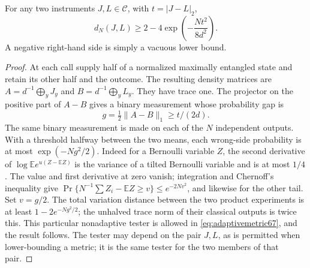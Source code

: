 \begin{lemma}\label{lem:choitesting67}
For any two instruments $J,L\in\mathcal C$, with $t=|J-L|_2$,
\begin{equation}\label{eq:choitesting67}
 d_N(J,L)\ge2-4\exp\left(-\frac{Nt^2}{8d^2}\right).
\end{equation}
A negative right-hand side is simply a vacuous lower bound.
\end{lemma}
\begin{proof}
At each call supply half of a normalized maximally entangled state and
retain its other half and the outcome. The resulting density matrices
are $A=d^{-1}\bigoplus_yJ_y$ and $B=d^{-1}\bigoplus_yL_y$.
They have trace one. The projector on the positive part of $A-B$
gives a binary measurement whose probability gap is
\[
 g=\tfrac12\|A-B\|_1\ge t/(2d).
\]
The same binary measurement is made on each of the $N$ independent
outputs. With a threshold halfway between the two means, each wrong-side
probability is at most $\exp(-Ng^2/2)$. Indeed for a Bernoulli variable
$Z$, the second derivative of
$\log\mathbb E e^{u(Z-\mathbb EZ)}$ is the variance of a tilted
Bernoulli variable and is at most $1/4$. The value and first derivative
at zero vanish; integration and Chernoff's inequality give
$\Pr\{N^{-1}\sum Z_i-\mathbb EZ\ge v\}\le e^{-2Nv^2}$,
and likewise for the other tail. Set $v=g/2$.
The total variation distance between the two product experiments is
at least $1-2e^{-Ng^2/2}$; the unhalved trace norm of their classical
outputs is twice this. This particular nonadaptive tester is allowed
in \eqref{eq:adaptivemetric67}, and the result follows. The tester may
depend on the pair $J,L$, as is permitted when lower-bounding a metric;
it is the same tester for the two members of that pair.
\end{proof}

